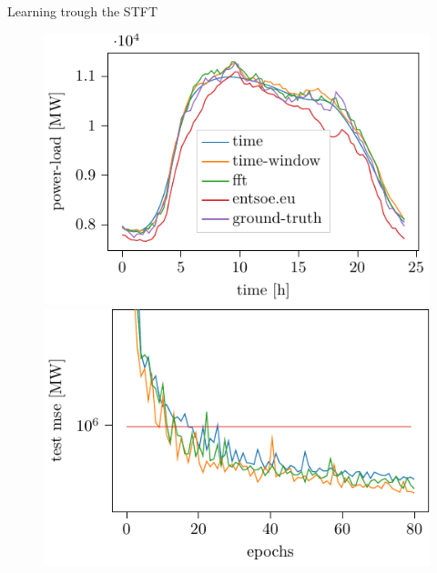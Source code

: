 \documentclass[xcolor=dvipsnames]{beamer}
\begin{document}
\begin{frame}{Learning trough the STFT \cite{wolter2018Fourier}}
\begin{figure}
    \centering
    \includegraphics[width=0.49\linewidth]{./img/day_ahead_plot.pdf}
    \includegraphics[width=0.49\linewidth]{./img/power_pred_15min_1d_test.pdf}
\end{figure}
\end{frame}
\end{document}
